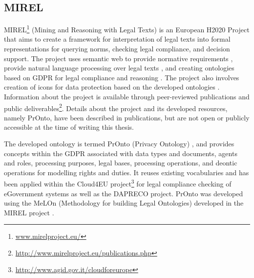 \subsection*{MIREL}\label{sec:sota:MIREL}
MIREL\footnote{\url{www.mirelproject.eu/}} (Mining and Reasoning with Legal Texts) is an European H2020 Project that aims to create a framework for interpretation of legal texts into formal representations for querying norms, checking legal compliance, and decision support. The project uses semantic web to provide normative requirements \cite{gandon_normative_2017}, provide natural language processing over legal texts \cite{teruel_legal_2018}, and creating ontologies based on GDPR \cite{monica_legal_2018} for legal compliance \cite{palmirani_pronto_2018-1} and reasoning \cite{palmirani_pronto_2018}. The project also involves creation of icons for data protection based on the developed ontologies \cite{arianna_dapis_2019}.
Information about the project is available through peer-reviewed publications and public deliverables\footnote{\url{http://www.mirelproject.eu/publications.php}}.
Details about the project and its developed resources, namely PrOnto, have  been described in publications, but are not open or publicly accessible at the time of writing this thesis.

The developed ontology is termed PrOnto (Privacy Ontology) \cite{monica_legal_2018}, and provides concepts within the GDPR associated with data types and documents, agents and roles, processing purposes, legal bases, processing operations, and deontic operations for modelling rights and duties. It reuses existing vocabularies \cite{palmirani_pronto_2018} and has been applied within the Cloud4EU project\footnote{\url{http://www.agid.gov.it/cloudforeurope}} for legal compliance checking of eGovernment systems as well as the DAPRECO project.
PrOnto was developed using the MeLOn (Methodology for building Legal Ontologies) developed in the MIREL project \cite{palmirani_pronto_2018,palmirani_pronto_2018-1,monica_modelling_2018}.


